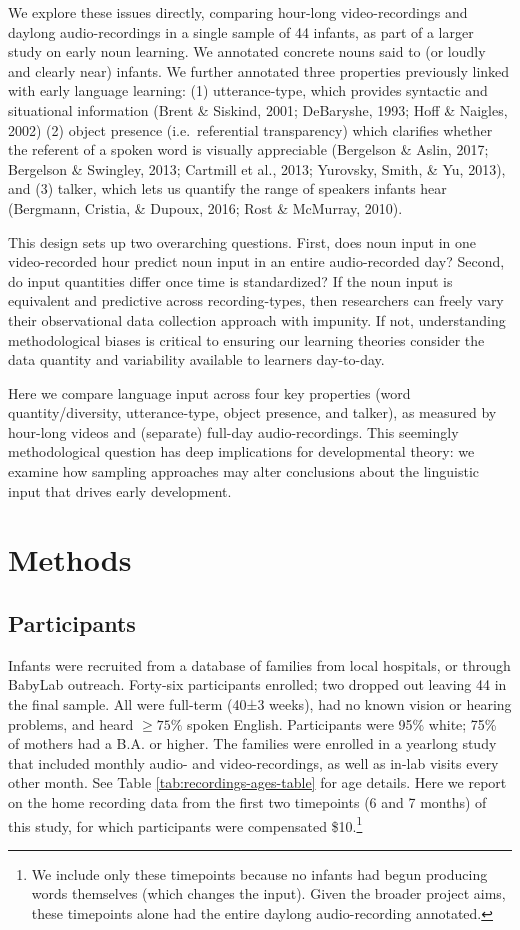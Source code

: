 \documentclass[man]{apa6}
\theoremstyle{definition}
\theoremstyle{definition}
\theoremstyle{definition}
\theoremstyle{remark}
\begin{document}
We explore these issues directly, comparing hour-long video-recordings
and daylong audio-recordings in a single sample of 44 infants, as part
of a larger study on early noun learning. We annotated concrete nouns
said to (or loudly and clearly near) infants. We further annotated three
properties previously linked with early language learning: (1)
utterance-type, which provides syntactic and situational information
(Brent \& Siskind, 2001; DeBaryshe, 1993; Hoff \& Naigles, 2002) (2)
object presence (i.e.~referential transparency) which clarifies whether
the referent of a spoken word is visually appreciable (Bergelson \&
Aslin, 2017; Bergelson \& Swingley, 2013; Cartmill et al., 2013;
Yurovsky, Smith, \& Yu, 2013), and (3) talker, which lets us quantify
the range of speakers infants hear (Bergmann, Cristia, \& Dupoux, 2016;
Rost \& McMurray, 2010).

This design sets up two overarching questions. First, does noun input in
one video-recorded hour predict noun input in an entire audio-recorded
day? Second, do input quantities differ once time is standardized? If
the noun input is equivalent and predictive across recording-types, then
researchers can freely vary their observational data collection approach
with impunity. If not, understanding methodological biases is critical
to ensuring our learning theories consider the data quantity and
variability available to learners day-to-day.

Here we compare language input across four key properties (word
quantity/diversity, utterance-type, object presence, and talker), as
measured by hour-long videos and (separate) full-day audio-recordings.
This seemingly methodological question has deep implications for
developmental theory: we examine how sampling approaches may alter
conclusions about the linguistic input that drives early development.

\section{Methods}\label{methods}

\subsection{Participants}\label{participants}

Infants were recruited from a database of families from local hospitals,
or through BabyLab outreach. Forty-six participants enrolled; two
dropped out leaving 44 in the final sample. All were full-term (40±3
weeks), had no known vision or hearing problems, and heard \(\geq 75\%\)
spoken English. Participants were 95\% white; 75\% of mothers had a B.A.
or higher. The families were enrolled in a yearlong study that included
monthly audio- and video-recordings, as well as in-lab visits every
other month. See Table \ref{tab:recordings-ages-table} for age details.
Here we report on the home recording data from the first two timepoints
(6 and 7 months) of this study, for which participants were compensated
\$10.\footnote{We include only these timepoints because no infants had begun producing words themselves (which changes the input). Given the broader project aims, these timepoints alone had the entire daylong audio-recording annotated.}
\end{document}
